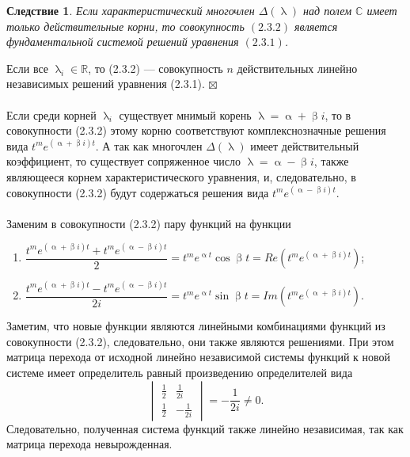 \documentclass[a4paper, 12pt]{report}
\newenvironment{Proof} %
{\par\noindent{$\blacklozenge$}} %
{\hfill$\scriptstyle\boxtimes$}
\newcommand{\Rm}{\mathbb{R}}
\newcommand{\Cm}{\mathbb{C}}
\renewcommand{\alpha}{\upalpha}
\renewcommand{\beta}{\upbeta}
\renewcommand{\lambda}{\uplambda}
\begin{document}
	\newtheorem*{2_3_2}{Следствие}\begin{2_3_2}
		Если характеристический многочлен $\Delta(\lambda)$ над полем $\Cm$ имеет только действительные корни, то совокупность $(2.3.2)$ является фундаментальной системой решений уравнения $(2.3.1)$.
	\end{2_3_2}\begin{Proof}
		Если все $\lambda_i\in\Rm$, то (2.3.2) --- совокупность $n$ действительных линейно независимых решений уравнения (2.3.1).
	\end{Proof}\\\\
	Если среди корней $\lambda_i$ существует мнимый корень $\lambda = \alpha + \beta i$, то в совокупности (2.3.2) этому корню соответствуют комплекснозначные решения вида $t^me^{(\alpha + \beta i)t}$. А так как многочлен $\Delta(\lambda)$ имеет действительный коэффициент, то существует сопряженное число $\lambda = \alpha - \beta i$, также являющееся корнем характеристического уравнения, и, следовательно, в совокупности (2.3.2) будут содержаться решения вида $t^me^{(\alpha - \beta i)t}$.\\\\
	Заменим в совокупности (2.3.2) пару функций на функции\begin{enumerate}
		\item $\dfrac{t^me^{(\alpha + \beta i)t} + t^me^{(\alpha - \beta i)t}}{2} = t^me^{\alpha t}\cos\beta t = Re(t^me^{(\alpha + \beta i)t})$;
		\item $\dfrac{t^me^{(\alpha + \beta i)t} - t^me^{(\alpha - \beta i)t}}{2i} = t^me^{\alpha t}\sin\beta t = Im(t^me^{(\alpha + \beta i)t})$.
	\end{enumerate}
	Заметим, что новые функции являются линейными комбинациями функций из совокупности (2.3.2), следовательно, они также являются решениями. При этом матрица перехода от исходной линейно независимой системы функций к новой системе имеет определитель равный произведению определителей вида $$\begin{vmatrix}
		\frac{1}{2} & \frac{1}{2i}\\
		\frac{1}{2} & -\frac{1}{2i}
	\end{vmatrix} = -\dfrac{1}{2i}\ne 0.$$ Следовательно, полученная система функций также линейно независимая, так как матрица перехода невырожденная.
\end{document}
